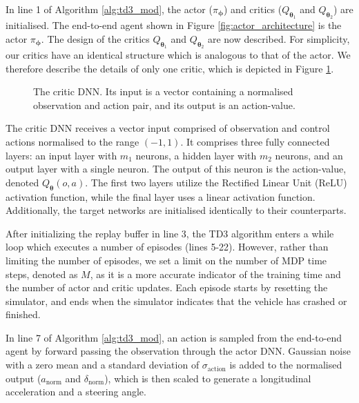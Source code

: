 In line 1 of Algorithm \ref{alg:td3_mod}, the actor ($\pi_{\bm{\phi}}$) and critics ($Q_{\bm{\theta}_1}$ and $Q_{\bm{\theta}_2}$) are initialised.
The end-to-end agent shown in Figure \ref{fig:actor_architecture} is the actor $\pi_{\bm{\phi}}$.
The design of the critics $Q_{\bm{\theta}_1}$ and $Q_{\bm{\theta}_2}$ are now described.
For simplicity, our critics have an identical structure which is analogous to that of the actor.
We therefore describe the details of only one critic, which is depicted in Figure \ref{fig:critic_architecture}.
\begin{figure}[htb!]
    \centering
    
    \caption[The critic DNN]{The critic DNN. Its input is a vector containing a normalised observation and action pair, and its output is an action-value.}
    \label{fig:critic_architecture}
\end{figure}
The critic DNN receives a vector input comprised of observation and control actions normalised to the range $(-1,1)$. 
It comprises three fully connected layers: an input layer with $m_1$ neurons, a hidden layer with $m_2$ neurons, and an output layer with a single neuron.
The output of this neuron is the action-value, denoted $Q_{\bm{\theta}}(o,a)$.
The first two layers utilize the Rectified Linear Unit (ReLU) activation function, while the final layer uses a linear activation function.
Additionally, the target networks are initialised identically to their counterparts.

After initializing the replay buffer in line 3, the TD3 algorithm enters a while loop which executes a number of episodes (lines 5-22). 
However, rather than limiting the number of episodes, we set a limit on the number of MDP time steps, denoted as $M$, as it is a more accurate indicator of the training time and the number of actor and critic updates. 
Each episode starts by resetting the simulator, and ends when the simulator indicates that the vehicle has crashed or finished.


In line 7 of Algorithm \ref{alg:td3_mod}, an action is sampled from the end-to-end agent by forward passing the observation through the actor DNN.
Gaussian noise with a zero mean and a standard deviation of $\sigma_{\text{action}}$ is added to the normalised output ($a_{\text{norm}}$ and $\delta_{\text{norm}}$), which is then scaled to generate a longitudinal acceleration and a steering angle.

